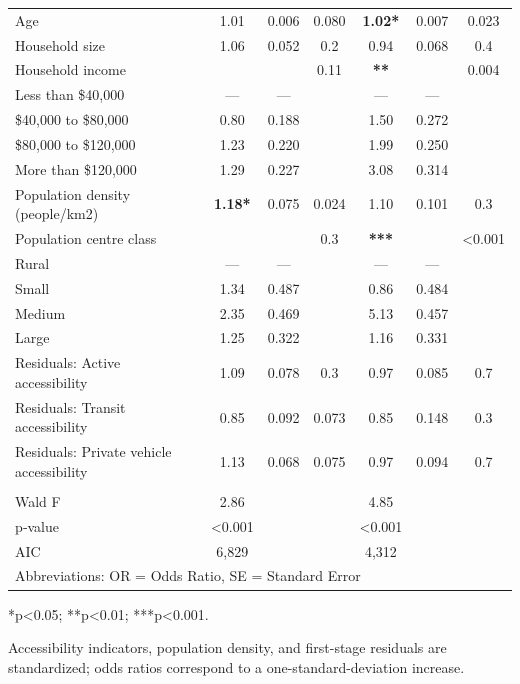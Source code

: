 \documentclass[preprint, 3p,
authoryear]{elsarticle} %
\begin{document}
\begin{table}
\begin{threeparttable}
\begin{tabular}[t]{lcccccc}
Age & 1.01 & 0.006 & 0.080 & \textbf{1.02*} & 0.007 & 0.023\\
\addlinespace
Household size & 1.06 & 0.052 & 0.2 & 0.94 & 0.068 & 0.4\\
Household income &  &  & 0.11 & \textbf{**} &  & 0.004\\
\hspace{1em}Less than \$40,000 & — & — &  & — & — & \\
\hspace{1em}\$40,000 to \$80,000 & 0.80 & 0.188 &  & 1.50 & 0.272 & \\
\hspace{1em}\$80,000 to \$120,000 & 1.23 & 0.220 &  & 1.99 & 0.250 & \\
\addlinespace
\hspace{1em}More than \$120,000 & 1.29 & 0.227 &  & 3.08 & 0.314 & \\
Population density (people/km2) & \textbf{1.18*} & 0.075 & 0.024 & 1.10 & 0.101 & 0.3\\
Population centre class &  &  & 0.3 & \textbf{***} &  & <0.001\\
\hspace{1em}Rural & — & — &  & — & — & \\
\hspace{1em}Small & 1.34 & 0.487 &  & 0.86 & 0.484 & \\
\addlinespace
\hspace{1em}Medium & 2.35 & 0.469 &  & 5.13 & 0.457 & \\
\hspace{1em}Large & 1.25 & 0.322 &  & 1.16 & 0.331 & \\
Residuals: Active accessibility & 1.09 & 0.078 & 0.3 & 0.97 & 0.085 & 0.7\\
Residuals: Transit accessibility & 0.85 & 0.092 & 0.073 & 0.85 & 0.148 & 0.3\\
Residuals: Private vehicle accessibility & 1.13 & 0.068 & 0.075 & 0.97 & 0.094 & 0.7\\
\midrule\\
\addlinespace
Wald F & 2.86 &  &  & 4.85 &  & \\
p‑value & <0.001 &  &  & <0.001 &  & \\
AIC & 6,829 &  &  & 4,312 &  & \\
\bottomrule
\multicolumn{7}{l}{\rule{0pt}{1em}Abbreviations: OR = Odds Ratio, SE = Standard Error}\\
\end{tabular}
\begin{tablenotes}
\small
\item [] *p<0.05; **p<0.01; ***p<0.001.
\item [] 
Accessibility indicators, population density, and first-stage residuals are standardized; odds ratios correspond to a one-standard-deviation increase.
\end{tablenotes}
\end{threeparttable}
\end{table}
\end{document}

